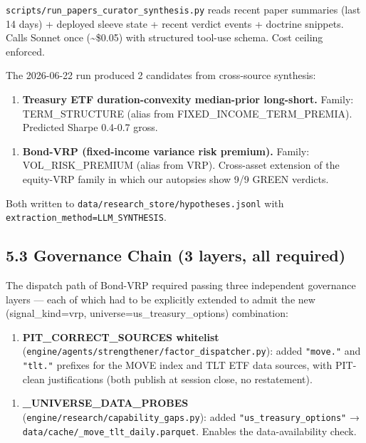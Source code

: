 \documentclass[11pt,a4paper]{article}
\begin{document}
\texttt{scripts/run\_papers\_curator\_synthesis.py} reads recent paper summaries (last 14 days) + deployed sleeve state + recent verdict events + doctrine snippets. Calls Sonnet once (\textasciitilde{}\$0.05) with structured tool-use schema. Cost ceiling enforced.

The 2026-06-22 run produced 2 candidates from cross-source synthesis:

\begin{enumerate}[leftmargin=*]
\item \textbf{Treasury ETF duration-convexity median-prior long-short.} Family: TERM\_STRUCTURE (alias from FIXED\_INCOME\_TERM\_PREMIA). Predicted Sharpe 0.4-0.7 gross.
\end{enumerate}

\begin{enumerate}[leftmargin=*]
\item \textbf{Bond-VRP (fixed-income variance risk premium).} Family: VOL\_RISK\_PREMIUM (alias from VRP). Cross-asset extension of the equity-VRP family in which our autopsies show 9/9 GREEN verdicts.
\end{enumerate}

Both written to \texttt{data/research\_store/hypotheses.jsonl} with \texttt{extraction\_method=LLM\_SYNTHESIS}.

\subsection{5.3 Governance Chain (3 layers, all required)}

The dispatch path of Bond-VRP required passing three independent governance layers — each of which had to be explicitly extended to admit the new (signal\_kind=vrp, universe=us\_treasury\_options) combination:

\begin{enumerate}[leftmargin=*]
\item \textbf{PIT\_CORRECT\_SOURCES whitelist} (\texttt{engine/agents/strengthener/factor\_dispatcher.py}): added \texttt{"move."} and \texttt{"tlt."} prefixes for the MOVE index and TLT ETF data sources, with PIT-clean justifications (both publish at session close, no restatement).
\end{enumerate}

\begin{enumerate}[leftmargin=*]
\item \textbf{\_UNIVERSE\_DATA\_PROBES} (\texttt{engine/research/capability\_gaps.py}): added \texttt{"us\_treasury\_options"} → \texttt{data/cache/\_move\_tlt\_daily.parquet}. Enables the data-availability check.
\end{enumerate}
\end{document}
